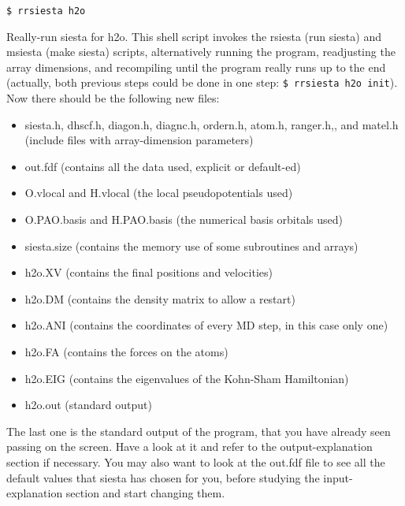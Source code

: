 {\tt \$ rrsiesta h2o}

\noindent
Really-run siesta for h2o. This shell script invokes the
rsiesta (run siesta) and msiesta (make siesta) scripts, 
alternatively running the program, readjusting the array dimensions,
and recompiling until the program really runs up to the end
(actually, both previous steps could be done in one
step: {\tt \$ rrsiesta h2o init}).
Now there should be the following new files:
\begin{itemize}
\item siesta.h, dhscf.h, 
diagon.h, diagnc.h, 
ordern.h, atom.h, ranger.h,,
and matel.h (include files with array-dimension parameters)
\item out.fdf
 (contains all the data used, explicit or default-ed) 
\item O.vlocal and H.vlocal
 (the local pseudopotentials used)
\item O.PAO.basis and 
H.PAO.basis
 (the numerical basis orbitals used)
\item siesta.size
 (contains the memory use of some subroutines and arrays)
\item h2o.XV
 (contains the final positions and velocities)
\item h2o.DM
 (contains the density matrix to allow a restart)
\item h2o.ANI
 (contains the coordinates of every MD step, in this case only one)
\item h2o.FA
 (contains the forces on the atoms)
\item h2o.EIG
 (contains the eigenvalues of the Kohn-Sham Hamiltonian)
\item h2o.out
 (standard output)
\end{itemize}

The last one is the standard output of the program, that you
have already seen passing on the screen. Have a look at it
and refer to the output-explanation section if necessary.
You may also want to look at the out.fdf file to see all
the default values that siesta has chosen for you, before
studying the input-explanation section and start changing them.

